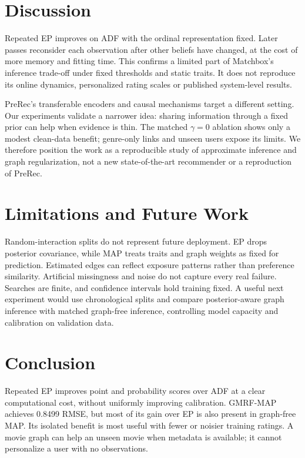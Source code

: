 \documentclass[11pt,a4paper]{article}
\begin{document}
\clearpage
\section{Discussion}\label{sec:discussion}
Repeated EP improves on ADF with the ordinal representation fixed. Later
passes reconsider each observation after other beliefs have changed, at
the cost of more memory and fitting time. This confirms a limited part of
Matchbox's inference trade-off under fixed thresholds and static traits.
It does not reproduce its online dynamics, personalized rating scales or
published system-level results.

PreRec's transferable encoders and causal mechanisms target a different
setting. Our experiments validate a narrower idea: sharing information
through a fixed prior can help when evidence is thin. The matched
$\gamma=0$ ablation shows only a modest clean-data benefit; genre-only
links and unseen users expose its limits. We therefore position the work
as a reproducible study of approximate inference and graph regularization,
not a new state-of-the-art recommender or a reproduction of PreRec.

\section{Limitations and Future Work}
Random-interaction splits do not represent future deployment. EP drops
posterior covariance, while MAP treats traits and graph weights as fixed
for prediction. Estimated edges can reflect exposure patterns rather than
preference similarity. Artificial missingness and noise do not capture
every real failure. Searches are finite, and confidence intervals hold
training fixed. A useful next experiment would use chronological splits
and compare posterior-aware graph inference with matched graph-free
inference, controlling model capacity and calibration on validation data.

\section{Conclusion}
Repeated EP improves point and probability scores over ADF at a clear
computational cost, without uniformly improving calibration. GMRF-MAP
achieves 0.8499 RMSE, but most of its gain over EP is also present in
graph-free MAP. Its isolated benefit is most useful with fewer or noisier
training ratings. A movie graph can help an unseen movie when metadata is
available; it cannot personalize a user with no observations.
\end{document}
